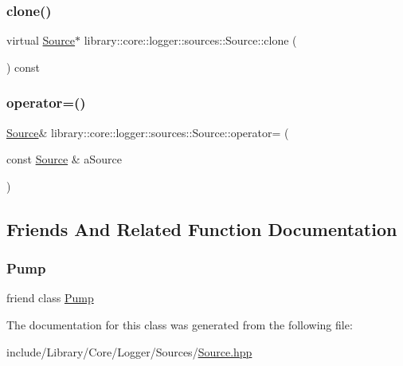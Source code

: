 \subsubsection{\texorpdfstring{clone()}{clone()}}
{\footnotesize\ttfamily virtual \hyperlink{classlibrary_1_1core_1_1logger_1_1sources_1_1Source}{Source}$\ast$ library\+::core\+::logger\+::sources\+::\+Source\+::clone (\begin{DoxyParamCaption}{ }\end{DoxyParamCaption}) const\hspace{0.3cm}{\ttfamily [virtual]}}

\mbox{\label{classlibrary_1_1core_1_1logger_1_1sources_1_1Source_a5d08e7063ee3b5d1c2b894d9747cc35f}} 
\subsubsection{\texorpdfstring{operator=()}{operator=()}}
{\footnotesize\ttfamily \hyperlink{classlibrary_1_1core_1_1logger_1_1sources_1_1Source}{Source}\& library\+::core\+::logger\+::sources\+::\+Source\+::operator= (\begin{DoxyParamCaption}\item[{const \hyperlink{classlibrary_1_1core_1_1logger_1_1sources_1_1Source}{Source} \&}]{a\+Source }\end{DoxyParamCaption})\hspace{0.3cm}{\ttfamily [default]}}



\subsection{Friends And Related Function Documentation}
\mbox{\label{classlibrary_1_1core_1_1logger_1_1sources_1_1Source_a64fbdb62a5c5f27e0d022da36aab93d9}} 
\subsubsection{\texorpdfstring{Pump}{Pump}}
{\footnotesize\ttfamily friend class \hyperlink{classlibrary_1_1core_1_1logger_1_1Pump}{Pump}\hspace{0.3cm}{\ttfamily [friend]}}



The documentation for this class was generated from the following file\+:\begin{DoxyCompactItemize}
\item 
include/\+Library/\+Core/\+Logger/\+Sources/\hyperlink{Sources_2Source_8hpp}{Source.\+hpp}\end{DoxyCompactItemize}
